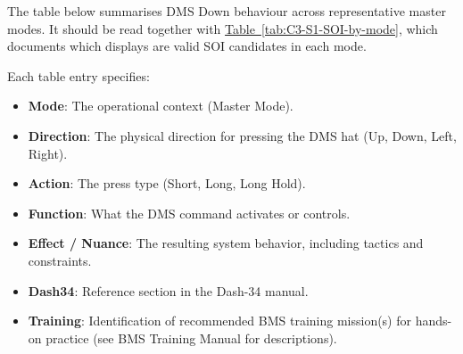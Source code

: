 \documentclass[11pt, a4paper, twoside]{report}
\newcommand{\tabref}[1]{\hyperref[#1]{Table~\ref*{#1}}}
\begin{document}
The table below summarises DMS Down behaviour across representative master modes. It should be read together with \tabref{tab:C3-S1-SOI-by-mode}, which documents which displays are valid SOI candidates in each mode.

Each table entry specifies:

\begin{itemize}
	\item \textbf{Mode}: The operational context (Master Mode).
	\item \textbf{Direction}: The physical direction for pressing the DMS hat (Up, Down, Left, Right).
	\item \textbf{Action}: The press type (Short, Long, Long Hold).
	\item \textbf{Function}: What the DMS command activates or controls.
	\item \textbf{Effect / Nuance}: The resulting system behavior, including tactics and constraints.
	\item \textbf{Dash34}: Reference section in the Dash-34 manual.
	\item \textbf{Training}: Identification of recommended BMS training mission(s) for hands-on practice (see BMS Training Manual for descriptions).
\end{itemize}
\end{document}
